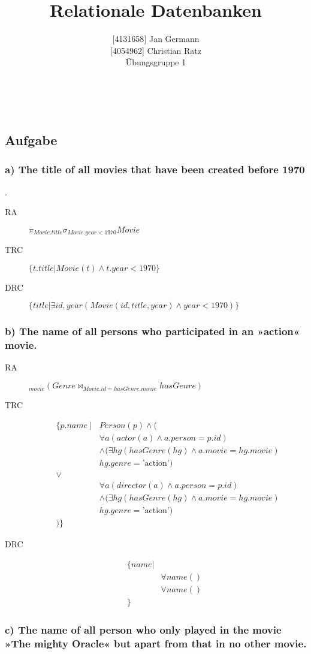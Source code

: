 \documentclass[11pt,a4paper,DIV=9]{scrartcl}
\author{{[}4131658{]} Jan Germann \\{[}4054962{]} Christian Ratz\\Übungsgruppe 1}
\title{Relationale Datenbanken}
\newcounter{temp}
\newcommand{\aufgabe}[1]{
  \setcounter{temp}{\value{subsection}}
  \setcounter{subsection}{#1}
  \addtocounter{subsection}{-1}
  \subsection{Aufgabe}
  \setcounter{subsection}{\value{temp}}
}
\newcommand{\teil}[2][]{
  \subsubsection*{#2) #1}
}
\renewcommand{\author}[1]{\renewcommand{\author}{#1}}
\renewcommand{\title}[1]{\renewcommand{\title}{#1}}
\newcommand{\makehomeworktitle}{
  \begin{minipage}[t]{6.5cm}
    \sf{\author}
  \end{minipage}
  \begin{minipage}[t]{6.5cm}
    \begin{flushright}
      \sf{\title\\\today}
    \end{flushright}
  \end{minipage}
  \\[0.2cm]
  \begin{center}
    \sf{
      \color{blue}{
        \LARGE{Aufgabenblatt \blattnr}
      }
    }
  \end{center}
  \vspace{0.1cm}
}
\begin{document}
\makehomeworktitle
\aufgabe{1}
\teil[The title of all movies that have been created before 1970]{a}.\hfill\\
      \begin{description}
        \item [RA]  $\pi_{Movie.title}\sigma_{Movie.year < 1970}Movie$
        \item [TRC] $ \{ t.title | Movie(t) \wedge t.year < 1970  \}$
        \item [DRC] $ \{ title | \exists id,year (Movie(id,title, year) \wedge year < 1970 )\}$
      \end{description}
\teil[The name of all persons who participated in an »action« movie.]{b}
      \begin{description}
        \item [RA]  $_{movie} (Genre \Join_{Movie.id=hasGenre.movie} hasGenre) $
        \item [TRC] \begin{align*}
                    \{ p.name\,|\,& Person(p) \wedge ( \\
                        &\forall a (actor(a) \wedge a.person = p.id) \\
                        &\wedge ( \exists hg ( hasGenre(hg) \wedge a.movie=hg.movie) \\
                        &  hg.genre = \textrm{'action'}) \\
                        \vee & \\
                        &\forall a (director(a) \wedge a.person = p.id) \\
                        &\wedge ( \exists hg ( hasGenre(hg) \wedge a.movie=hg.movie) \\
                        &  hg.genre = \textrm{'action'}) \\
                      )\}
                    \end{align*}

        \item [DRC]
        \begin{align*}
        \{ name | & \\
                  & \forall name () 
                  & \\
                  & \forall name () \\
        \}
        \end{align*}
      \end{description}
\teil[The name of all person who only played in the movie »The mighty Oracle« but apart from that in no other movie.]{c}
\end{document}
